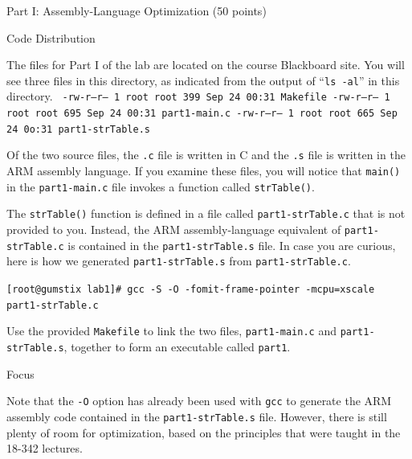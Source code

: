 \documentclass{article}
\begin{document}
	\begin{section}{Part I: Assembly-Language Optimization (50 points)}

		\begin{subsection}{Code Distribution}

			\noindent
			The files for Part I of the lab are located on the course Blackboard site. \newline
			\noindent
			You will see three files in this directory, as
			indicated from the output of ``\texttt{ls -al}'' in
			this directory. \newline
			\texttt{
			-rw-r--r-- 1 root root  399 Sep 24 00:31 Makefile \newline
			-rw-r--r-- 1 root root  695 Sep 24 00:31 part1-main.c \newline
			-rw-r--r-- 1 root root  665 Sep 24 0o:31 part1-strTable.s \newline
			}

			Of the two source files, the \texttt{.c} file
			is written in C and the \texttt{.s} file is
			written in the ARM assembly language. If you
			examine these files, you will notice that
			\texttt{main()} in the \texttt{part1-main.c}
			file invokes a function called
			\texttt{strTable()}.

			The \texttt{strTable()} function is defined in
			a file called \texttt{part1-strTable.c} that
			is not provided to you. Instead, the ARM
			assembly-language equivalent of
			\texttt{part1-strTable.c} is contained in the
			\texttt{part1-strTable.s} file.  In case you
			are curious, here is how we generated
			\texttt{part1-strTable.s} from
			\texttt{part1-strTable.c}. \newline

			\noindent
			\texttt{[root@gumstix lab1]\# gcc -S -O
			-fomit-frame-pointer -mcpu=xscale
			part1-strTable.c} \newline

			Use the provided \texttt{Makefile} to link the
			two files, \texttt{part1-main.c} and
			\texttt{part1-strTable.s}, together to form an
			executable called \texttt{part1}.

		\end{subsection}			

		\begin{subsection}{Focus}

			Note that the \texttt{-O} option has already
			been used with \texttt{gcc} to generate the
			ARM assembly code contained in the
			\texttt{part1-strTable.s} file. However, there
			is still plenty of room for optimization,
			based on the principles that were taught in
			the 18-342 lectures.


\end{subsection}
\end{section}
\end{document}
